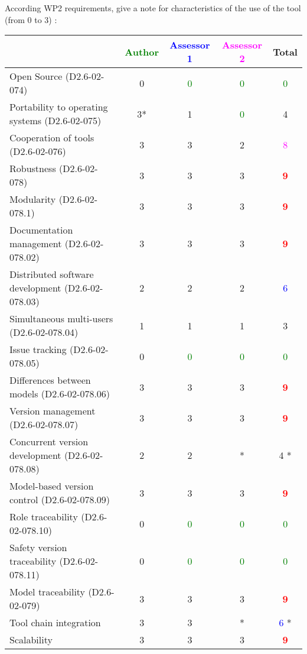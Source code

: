 According WP2 requirements, give a note for characteristics of the use of the tool (from 0 to 3) :

\begin{tabular}{|l | c | c | c | c|}
\hline
& \textcolor{green}{Author} & \textcolor{blue}{Assessor 1} & \textcolor{magenta}{Assessor 2} & Total \\
\hline 
Open Source (D2.6-02-074) &  0& \textcolor{green}{0} & \textcolor{green}{0}   & \textcolor{green}{0} \\
\hline 
Portability to operating systems (D2.6-02-075) &  3*&
1 & \textcolor{green}{0}   & 4    \\
\hline
Cooperation of tools (D2.6-02-076) &  3& 3    &2 & \textcolor{magenta}{8} \\
\hline
Robustness (D2.6-02-078) &  3& 3    &3 & \textcolor{red}{\textbf{9}} \\
\hline
Modularity (D2.6-02-078.1) &  3& 3    &3 & \textcolor{red}{\textbf{9}} \\
\hline
Documentation management (D2.6-02-078.02) &  3& 3    &3 & \textcolor{red}{\textbf{9}} \\
\hline
Distributed software development (D2.6-02-078.03)  &
2& 2    &2 & \textcolor{blue}{6} \\
\hline
Simultaneous multi-users (D2.6-02-078.04)   &  1& 1    &1 & 3    \\
\hline
Issue tracking (D2.6-02-078.05) &  0& \textcolor{green}{0}   & \textcolor{green}{0}   & \textcolor{green}{0} \\
\hline
Differences between models (D2.6-02-078.06) &  3& 3    &3 & \textcolor{red}{\textbf{9}} \\
\hline
Version management (D2.6-02-078.07) &  3& 3    &3 & \textcolor{red}{\textbf{9}} \\
\hline
Concurrent version development (D2.6-02-078.08) &  2&
2& * & 4   * \\
\hline
Model-based version control (D2.6-02-078.09) &  3& 3    &3 & \textcolor{red}{\textbf{9}} \\
\hline
Role traceability (D2.6-02-078.10) &  0& \textcolor{green}{0} & \textcolor{green}{0}   & \textcolor{green}{0} \\
\hline
Safety version traceability (D2.6-02-078.11) &  0& \textcolor{green}{0} & \textcolor{green}{0}   & \textcolor{green}{0} \\
\hline
Model traceability (D2.6-02-079) & 3    & 3    &3 & \textcolor{red}{\textbf{9}} \\
\hline
Tool chain integration & 3    & 3    &* & \textcolor{blue}{6} * \\
\hline
Scalability & 3    & 3    &3 & \textcolor{red}{\textbf{9}} \\
\hline
\end{tabular}

